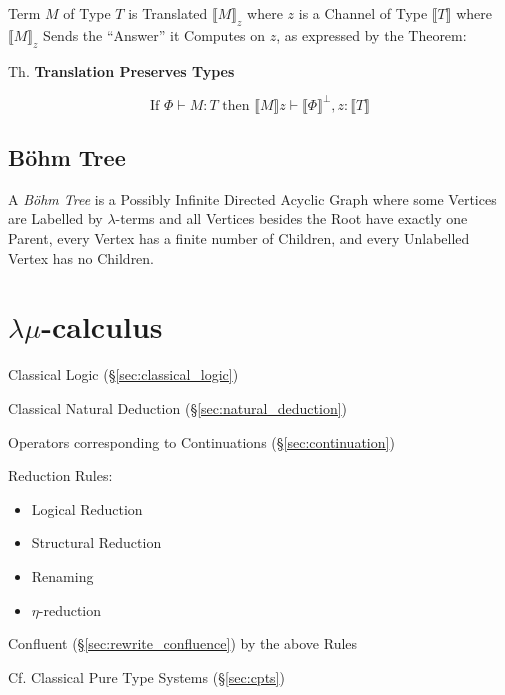 Term $M$ of Type $T$ is Translated $\llbracket M \rrbracket_z$ where
$z$ is a Channel of Type $\llbracket T \rrbracket$ where $\llbracket M
\rrbracket_z$ Sends the ``Answer'' it Computes on $z$, as expressed by
the Theorem:

Th. \textbf{Translation Preserves Types}

\[
  \text{If } \Phi \vdash M : T \text{ then }
  \llbracket M \rrbracket z \vdash \llbracket \Phi \rrbracket^\bot,
  z : \llbracket T \rrbracket
\]



\subsection{B\"ohm Tree}\label{sec:bohm_tree}

A \emph{B\"ohm Tree} is a Possibly Infinite Directed Acyclic Graph
where some Vertices are Labelled by $\lambda$-terms and all Vertices
besides the Root have exactly one Parent, every Vertex has a finite
number of Children, and every Unlabelled Vertex has no Children.



\section{$\lambda\mu$-calculus}\label{sec:lambda_mu}

Classical Logic (\S\ref{sec:classical_logic})

Classical Natural Deduction (\S\ref{sec:natural_deduction})

Operators corresponding to Continuations (\S\ref{sec:continuation})

Reduction Rules:
\begin{itemize}
  \item Logical Reduction
  \item Structural Reduction
  \item Renaming
  \item $\eta$-reduction
\end{itemize}

Confluent (\S\ref{sec:rewrite_confluence}) by the above Rules

\fist Cf. Classical Pure Type Systems (\S\ref{sec:cpts})


